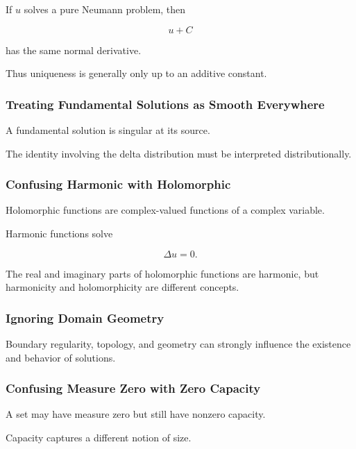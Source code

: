 If \(u\) solves a pure Neumann problem, then

\[
u+C
\]

has the same normal derivative.

Thus uniqueness is generally only up to an additive constant.

\subsubsection{Treating Fundamental Solutions as Smooth Everywhere}

A fundamental solution is singular at its source.

The identity involving the delta distribution must be interpreted
distributionally.

\subsubsection{Confusing Harmonic with Holomorphic}

Holomorphic functions are complex-valued functions of a complex variable.

Harmonic functions solve

\[
\Delta u=0.
\]

The real and imaginary parts of holomorphic functions are harmonic, but
harmonicity and holomorphicity are different concepts.

\subsubsection{Ignoring Domain Geometry}

Boundary regularity, topology, and geometry can strongly influence the
existence and behavior of solutions.

\subsubsection{Confusing Measure Zero with Zero Capacity}

A set may have measure zero but still have nonzero capacity.

Capacity captures a different notion of size.

